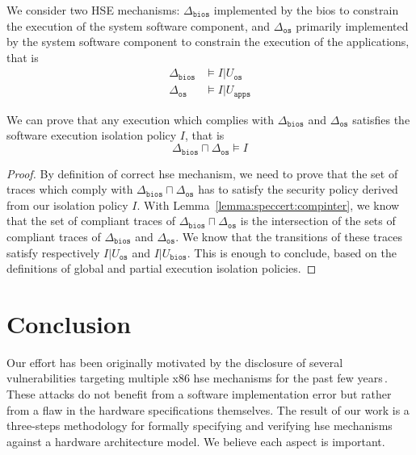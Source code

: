 \begin{example}
  We consider two HSE mechanisms: $\Delta_\mathtt{bios}$ implemented by the
  \ac{bios} to constrain the execution of the system software component, and
  $\Delta_\mathtt{os}$ primarily implemented by the system software component to
  constrain the execution of the applications, that is
  \[
    \begin{array}{cl}
      \Delta_{\mathtt{bios}}
      & \models I|U_{\mathtt{os}} \\
      \Delta_{\mathtt{os}} & \models
                             I|U_{\mathtt{apps}}
    \end{array}
  \]

  We can prove that any execution which complies with $\Delta_\mathtt{bios}$ and
  $\Delta_\mathtt{os}$ satisfies the software execution isolation policy $I$,
  that is
  \[
    \Delta_{\mathtt{bios}} \sqcap \Delta_{\mathtt{os}} \models I
  \]

  \begin{proof}
    By definition of correct \ac{hse} mechanism, we need to prove that the set
    of traces which comply with
    $\Delta_{\mathtt{bios}} \sqcap \Delta_{\mathtt{os}}$ has to satisfy the
    security policy derived from our isolation policy $I$.
    With Lemma~\ref{lemma:speccert:compinter}, we know that the set of compliant
    traces of $\Delta_{\mathtt{bios}} \sqcap \Delta_{\mathtt{os}}$ is the
    intersection of the sets of compliant traces of $\Delta_{\mathtt{bios}}$ and
    $\Delta_{\mathtt{os}}$.
    We know that the transitions of these traces satisfy respectively
    $I|U_{\mathtt{os}}$ and $I|U_{\mathtt{bios}}$.
    This is enough to conclude, based on the definitions of global and partial
    execution isolation policies.
  \end{proof}
\end{example}

\section{Conclusion}
\label{sec:speccert:discuss}

Our effort has been originally motivated by the disclosure of several
vulnerabilities targeting multiple x86 \ac{hse} mechanisms for the past few
years\,\cite{wojtczuk2009smram,duflot2009smram,rutkowska2008remap,domas2015sinkhole,kallenberg2015racecondition}.
%
These attacks do not benefit from a software implementation error but rather
from a flaw in the hardware specifications themselves.
%
The result of our work is a three-steps methodology for formally specifying and
verifying \ac{hse} mechanisms against a hardware architecture model.
%
We believe each aspect is important.

